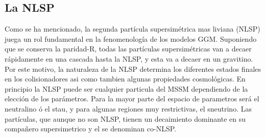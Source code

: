 



\subsection{La NLSP}

Como se ha mencionado, la segunda partícula supersimétrica mas liviana (NLSP) juega un rol fundamental
en la fenomenología de los modelos GGM. Suponiendo que se conserva la paridad-R,
todas las partículas supersimétricas van a decaer rápidamente en una cascada
hasta la NLSP, y esta va a decaer en un gravitino. Por este motivo, la
naturaleza de la NLSP determina los diferentes estados finales en los
colisionadores asi como tambien algunas propiedades cosmológicas. En principio
la NLSP puede ser cualquier particula del MSSM dependiendo de la elección de los
parámetros. Para la mayor parte del espacio de parametros será el neutralino ó
el stau, y para algunas regiones muy restrictivas, el
sneutrino\cite{arxiv:9801271}.
Las partículas, que aunque no son NLSP, tienen un decaimiento dominante en su
compañero supersimetrico y el {\gravino} se denominan co-NLSP.



